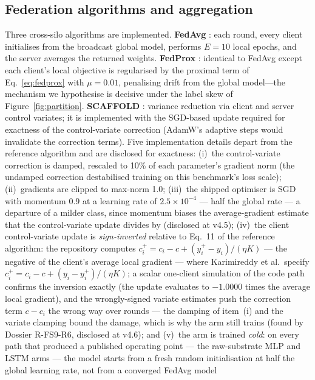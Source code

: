 \subsection{Federation algorithms and aggregation}

Three cross-silo algorithms are implemented. \textbf{FedAvg}
\cite{mcmahan2017}: each round, every client initialises from the
broadcast global model, performs $E=10$ local epochs, and the server
averages the returned weights. \textbf{FedProx} \cite{li2020}: identical
to FedAvg except each client's local objective is regularised by the
proximal term of Eq.~\eqref{eq:fedprox} with
$\mu = 0.01$, penalising drift from the global model---the mechanism
we hypothesise is decisive under the label skew of
Figure~\ref{fig:partition}. \textbf{SCAFFOLD} \cite{karimireddy2020}:
variance reduction via client and server control variates; it is
implemented with the SGD-based update required for exactness of the
control-variate correction (AdamW's adaptive steps would invalidate
the correction terms). Five implementation details depart from the
reference algorithm and are disclosed for exactness: (i)\ the
control-variate correction is damped, rescaled to 10\% of each
parameter's gradient norm (the undamped correction destabilised
training on this benchmark's loss scale); (ii)\ gradients are clipped
to max-norm 1.0; (iii)\ the shipped optimiser is SGD with momentum
$0.9$ at a learning rate of $2.5\times10^{-4}$ --- half the global
rate --- a departure of a milder class, since momentum biases the
average-gradient estimate that the control-variate update divides by
(disclosed at v4.5); (iv)\ the client control-variate update is
\emph{sign-inverted} relative to Eq.~11 of the reference algorithm:
the repository computes
$c_i^{+} = c_i - c + (y_i^{+} - y_i)/(\eta K)$ --- the negative of
the client's average local gradient --- where Karimireddy et
al.\ specify $c_i^{+} = c_i - c + (y_i - y_i^{+})/(\eta K)$; a
scalar one-client simulation of the code path confirms the inversion
exactly (the update evaluates to $-1.0000$ times the average local
gradient), and the wrongly-signed variate estimates push the
correction term $c - c_i$ the wrong way over rounds --- the damping
of item~(i) and the variate clamping bound the damage, which is why
the arm still trains (found by Dossier R-FS9-R6, disclosed at
v4.6); and (v)\ the arm is trained \emph{cold}: on every path that
produced a published operating point --- the raw-substrate MLP and
LSTM arms --- the model starts from a fresh random initialisation at
half the global learning rate, not from a converged FedAvg model
